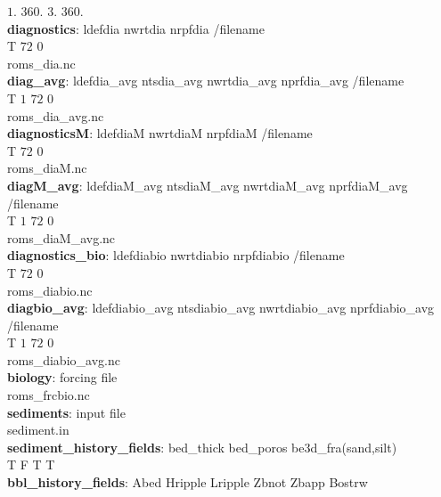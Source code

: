                 $1.$       $360.$      $3.$      $360.$ \\
\textbf{diagnostics}:   ldefdia   nwrtdia    nrpfdia /filename \\
                  T        $72$         $0$ \\
                                 roms\_dia.nc \\
\textbf{diag\_avg}: ldefdia\_avg  ntsdia\_avg  nwrtdia\_avg  nprfdia\_avg /filename \\
               T          $1 $          $72$            0 \\
                                 roms\_dia\_avg.nc \\
\textbf{diagnosticsM}:   ldefdiaM   nwrtdiaM    nrpfdiaM /filename \\
                   T          $72$          $0$ \\
                                 roms\_diaM.nc \\
\textbf{diagM\_avg}: ldefdiaM\_avg  ntsdiaM\_avg  nwrtdiaM\_avg  nprfdiaM\_avg /filename \\
               T          $1$           $72$            $0$ \\
                                 roms\_diaM\_avg.nc \\
\textbf{diagnostics\_bio}:   ldefdiabio   nwrtdiabio    nrpfdiabio /filename \\
                        T          $72$             $0$ \\
                                 roms\_diabio.nc \\
\textbf{diagbio\_avg}: ldefdiabio\_avg  ntsdiabio\_avg  nwrtdiabio\_avg  nprfdiabio\_avg
/filename \\
                  T              $1$             $72$              $0$ \\
                                 roms\_diabio\_avg.nc \\
\textbf{biology}:   forcing file \\
           roms\_frcbio.nc \\
\textbf{sediments}: input file \\
           sediment.in \\
\textbf{sediment\_history\_fields}: bed\_thick bed\_poros be3d\_fra(sand,silt) \\
                            T         F        T  T \\
\textbf{bbl\_history\_fields}: Abed Hripple Lripple Zbnot Zbapp Bostrw \\
